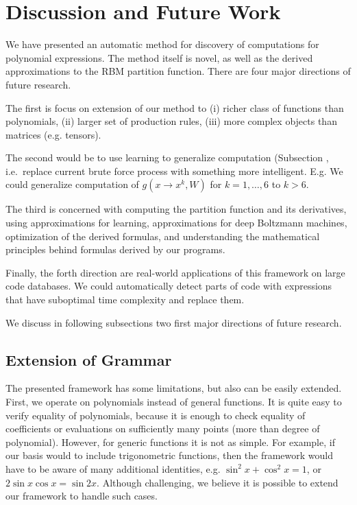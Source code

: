 \section{Discussion and Future Work}

We have presented an automatic method for discovery of computations for
 polynomial expressions. The method itself is novel, as well as the derived
approximations to the RBM partition function.  There are four
major directions of future research. 


The first is focus on extension of our method
to (i) richer class of functions than polynomials, (ii) larger set of production
rules, (iii) more complex objects than matrices (e.g. tensors).


The second would be to use learning to
generalize computation (Subsection \label{agenda)}, i.e.~replace current brute force process with
something more intelligent. E.g. We could generalize computation of
$g(x \rightarrow x^k, W)$ for $k = 1, \dots, 6$ to $k > 6$. 


The third is concerned with computing
the partition function and its derivatives, using approximations for
learning, approximations for deep Boltzmann machines, optimization of
the derived formulas, and understanding the mathematical principles behind
formulas derived by our programs. 


Finally,
the forth direction are real-world applications of this framework on
large code databases. We could automatically detect parts of code with
expressions that have suboptimal time complexity and replace them.


We discuss in following subsections two first major directions of future research.


\subsection{Extension of Grammar}
The presented framework has some limitations, but also can be easily extended. First,
we operate on polynomials instead of general functions. It is quite easy to verify
equality of polynomials, because it is enough to check equality of coefficients or
evaluations on sufficiently many points (more than degree of
polynomial). However, for generic functions
it is not as simple. For example, if our basis would to include trigonometric functions, then the
framework would have to be aware of many additional identities,
e.g. $\sin^2{x} + \cos^2{x} = 1$, or $2\sin x \cos x = \sin
2x$. Although challenging, we believe it is possible to extend our
framework to handle such cases. 

